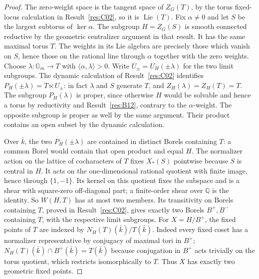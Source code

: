 \documentclass[11pt,a4paper,openany,oneside]{book}
\theoremstyle{resultstyle}
\theoremstyle{definition}
\numberwithin{equation}{chapter}
\newcommand{\Gm}{\mathbb{G}_m}
\DeclareMathOperator{\Lie}{Lie}
\newcommand{\QQ}{\mathbb{Q}}
\begin{document}
\begin{proof}
The zero-weight space is the tangent space of \(Z_G(T)\),
by the torus fixed-locus calculation in Result~\ref{res:C02},
so it is \(\Lie(T)\). Fix \(\alpha\ne0\) and let \(S\) be the
largest subtorus of \(\ker\alpha\). The subgroup \(H=Z_G(S)\)
is smooth connected reductive by the geometric centralizer
argument in that result. It has the same maximal torus \(T\).
The weights in its Lie algebra are precisely those which
vanish on \(S\), hence those on the rational line through
\(\alpha\) together with the zero weights. Choose
\(\lambda:\Gm\to T\) with \(\langle\alpha,\lambda\rangle>0\).
Write \(U_\pm=U_H(\pm\lambda)\) for the two limit subgroups.
The dynamic calculation of Result~\ref{res:C02} identifies
\(P_H(\pm\lambda)=T\ltimes U_\pm\): in fact \(\lambda\)
and \(S\) generate \(T\), and \(Z_H(\lambda)=Z_H(T)=T\).
The subgroup \(P_H(\lambda)\) is proper, since otherwise
\(H\) would be solvable and hence a torus by reductivity
and Result~\ref{res:B12}, contrary to the \(\alpha\)-weight.
The opposite subgroup is proper as well by the same
argument. Their product contains an open subset by the
dynamic calculation.

Over \(\bar k\), the two \(P_H(\pm\lambda)\) are contained
in distinct Borels containing \(T\): a common Borel would
contain that open product and equal \(H\). The normalizer
action on the lattice of cocharacters of \(T\) fixes
\(X_*(S)\) pointwise because \(S\) is central in \(H\).
It acts on the one-dimensional rational quotient with
finite image, hence through \(\{1,-1\}\).
Its kernel on this quotient fixes the subspace and is a
shear with square-zero off-diagonal part; a finite-order
shear over \(\QQ\) is the identity. So \(W(H,T)\) has at
most two members. Its transitivity on Borels containing
\(T\), proved in Result~\ref{res:C02}, gives exactly two
Borels \(B^+,B^-\) containing \(T\), with the respective
limit subgroups. For \(X=H/B^+\), the fixed points of \(T\)
are indexed by \(N_H(T)(\bar k)/T(\bar k)\).
Indeed every fixed coset has a normalizer representative
by conjugacy of maximal tori in \(B^+\);
\(N_H(T)(\bar k)\cap B^+(\bar k)=T(\bar k)\) because
conjugation in \(B^+\) acts trivially on the torus quotient,
which restricts isomorphically to \(T\).
Thus \(X\) has exactly two geometric fixed points.


\end{proof}
\end{document}
